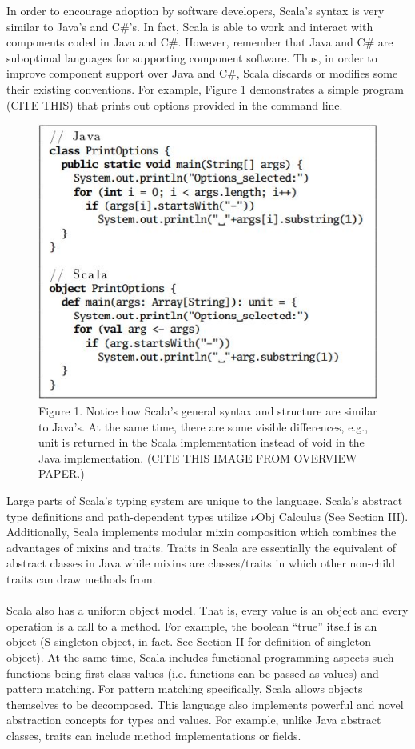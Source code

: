\documentclass[jou,apacite]{IEEEtran}
\begin{document}
In order to encourage adoption by software developers, Scala's syntax is very similar to Java's and C\#'s. In fact, Scala is able to work and interact with components coded in Java and C\#. However, remember that Java and C\# are suboptimal languages for supporting component software. Thus, in order to improve component support over Java and C\#, Scala discards or modifies some their existing conventions. For example, Figure 1 demonstrates a simple program (CITE THIS) that prints out options provided in the command line.
\begin{figure}[h]
  \centering
  \includegraphics[width=\columnwidth]{print_options.JPG}
  \caption{Figure 1. Notice how Scala's general syntax and structure are similar
    to Java's. At the same time, there are some visible differences, e.g., unit
    is returned in the Scala implementation instead of void in the Java
    implementation. (CITE THIS IMAGE FROM OVERVIEW PAPER.)}
  \label{fig:example}
\end{figure}

Large parts of Scala's typing system are unique to the language. Scala's abstract type definitions and path-dependent types utilize $\nu$Obj Calculus (See Section III). Additionally, Scala implements modular mixin composition which combines the advantages of mixins and traits. Traits in Scala are essentially the equivalent of abstract classes in Java while mixins are classes/traits in which other non-child traits can draw methods from. \\\\
Scala also has a uniform object model. That is, every value is an object and
every operation is a call to a method. For example, the boolean “true” itself is
an object (S singleton object, in fact. See Section II for definition of
singleton object). At the same time, Scala includes functional programming
aspects such functions being first-class values (i.e. functions can be passed as
values) and pattern matching. For pattern matching specifically, Scala allows
objects themselves to be decomposed. This language also implements powerful and
novel abstraction concepts for types and values. For example, unlike Java
abstract classes, traits can include method implementations or fields.
\end{document}
